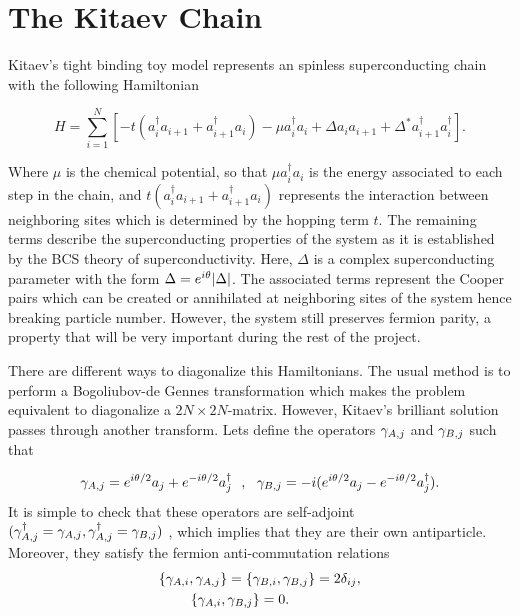





\section{The Kitaev Chain \label{sec:KitaevChain}}

Kitaev's tight binding toy model  represents an spinless superconducting chain with the following Hamiltonian

\begin{equation}
H = \sum_{i=1}^N \left[ -t(a_i^{\dagger} a_{i+1} + a_{i+1}^{\dagger}a_i) -\mu a_i^{\dagger} a_{i} +  \Delta a_{i}a_{i+1} + \Delta^* a_{i+1}^{\dagger}a_i^{\dagger} \right].  \label{eq:kitaevHam}
\end{equation}



\noindent Where $\mu$ is the chemical potential, so that $\mu a_i^{\dagger} a_{i}$ is the energy associated to each step in the chain, and $t(a_i^{\dagger} a_{i+1} + a_{i+1}^{\dagger}a_i)$ represents the interaction between neighboring sites which is determined by the hopping term $t$. The remaining terms describe the superconducting properties of the system as it is established by the BCS theory of superconductivity. Here, $\Delta$ is a complex superconducting parameter with the form  $\Delta = e^{i\theta} \vert \Delta \vert$. The associated terms represent the Cooper pairs which can be created or annihilated at neighboring sites of the system hence breaking particle number. However, the system still preserves fermion parity, a property that will be very important during the rest of the project. 

There are different ways to diagonalize this Hamiltonians. The usual method is to perform a Bogoliubov-de Gennes transformation which makes the problem equivalent to diagonalize a $2N\times2N$-matrix. However, Kitaev's brilliant solution passes through another transform. Lets define the operators $\gamma_{A,j}$ and $\gamma_{B,j}$ such that

\begin{equation}
\gamma_{A,j} = e^{i\theta /2}a_j+ e^{-i\theta/2 } a^{\dagger}_j \ \ , \ \ \gamma_{B,j} = -i(e^{i\theta /2}a_j - e^{-i\theta/2} a^{\dagger}_j).
\label{eq:MajoranaTrans}
\end{equation}
It is simple to check that these operators are self-adjoint $(\gamma_{A,j}^\dagger = \gamma_{A,j}, \gamma_{A,j}^\dagger = \gamma_{B,j})$ , which implies that they are their own antiparticle.  Moreover, they satisfy the fermion anti-commutation relations
\begin{equation}
\begin{aligned}
\{\gamma_{A,i}, \gamma_{A,j}\} = \{ & \gamma_{B,i} , \gamma_{B,j}\} = 2\delta_{ij}  ,\\ 
  \{\gamma_{A,i}, \gamma_{B,j} & \} =0.
\end{aligned} 
\label{MajoranaRel}
\end{equation} 

